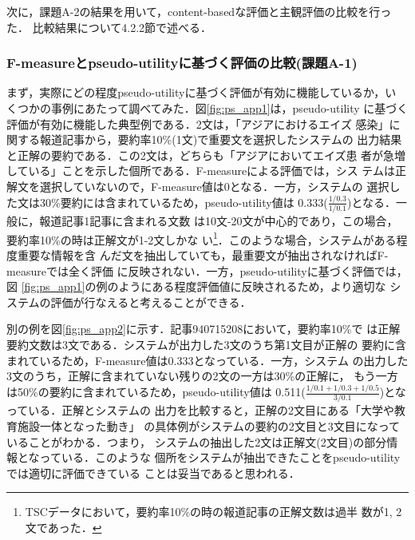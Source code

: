 次に，課題A-2の結果を用いて，content-basedな評価と主観評価の比較を行った．
比較結果について4.2.2節で述べる．

\subsubsection{F-measureとpseudo-utilityに基づく評価の比較(課題A-1)}

まず，実際にどの程度pseudo-utilityに基づく評価が有効に機能しているか，い
くつかの事例にあたって調べてみた．図\ref{fig:ps_app1}は，pseudo-utility
に基づく評価が有効に機能した典型例である．2文は，「アジアにおけるエイズ
感染」に関する報道記事から，要約率10\%(1文)で重要文を選択したシステムの
出力結果と正解の要約である．この2文は，どちらも「アジアにおいてエイズ患
者が急増している」ことを示した個所である．F-measureによる評価では，シス
テムは正解文を選択していないので，F-measure値は0となる．一方，システムの
選択した文は30\%要約には含まれているため，pseudo-utility値は
0.333($\frac{1/0.3}{1/0.1}$)となる．一般に，報道記事1記事に含まれる文数
は10文-20文が中心的であり，この場合，要約率10\%の時は正解文が1-2文しかな
い\footnote{TSCデータにおいて，要約率10\%の時の報道記事の正解文数は過半
数が1, 2文であった．}．このような場合，システムがある程度重要な情報を含
んだ文を抽出していても，最重要文が抽出されなければF-measureでは全く評価
に反映されない．一方，pseudo-utilityに基づく評価では，図
\ref{fig:ps_app1}の例のようにある程度評価値に反映されるため，より適切な
システムの評価が行なえると考えることができる．

別の例を図\ref{fig:ps_app2}に示す．記事940715208において，要約率10\%で
は正解要約文数は3文である．システムが出力した3文のうち第1文目が正解の
要約に含まれているため，F-measure値は0.333となっている．一方，システム
の出力した3文のうち，正解に含まれていない残りの2文の一方は30\%の正解に，
もう一方は50\%の要約に含まれているため，pseudo-utility値は
0.511($\frac{1/0.1+1/0.3+1/0.5}{3/0.1}$)となっている．正解とシステムの
出力を比較すると，正解の2文目にある「大学や教育施設一体となった動き」
の具体例がシステムの要約の2文目と3文目になっていることがわかる．つまり，
システムの抽出した2文は正解文(2文目)の部分情報となっている．このような
個所をシステムが抽出できたことをpseudo-utilityでは適切に評価できている
ことは妥当であると思われる．

